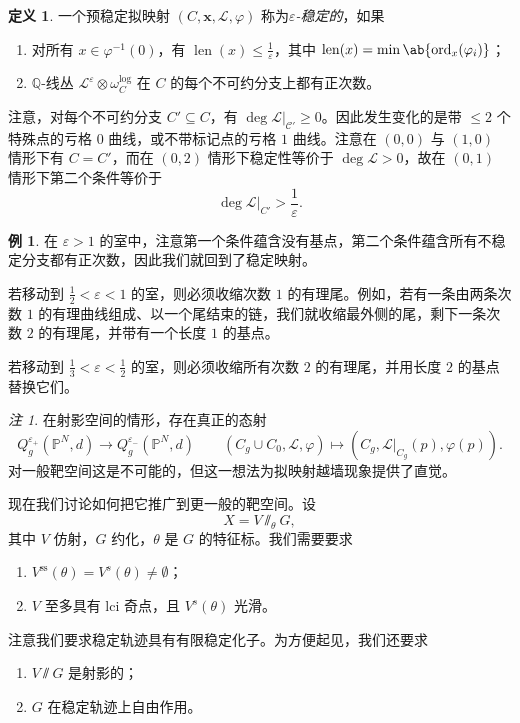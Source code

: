 \documentclass{amsart}
\theoremstyle{definition}
\newtheorem{defn}[thm]{定义}
\newtheorem{exm}[thm]{例}
\theoremstyle{remark}
\newtheorem{rmk}[thm]{注}
\theoremstyle{plain}
\theoremstyle{definition}
\theoremstyle{remark}
\newcommand{\Q}{\mathbb{Q}}
\renewcommand{\P}{\mathbb{P}}
\newcommand{\ep}{\varepsilon}
\newcommand{\mc}[1]{\mathcal{#1}}
\newcommand{\mr}[1]{\mathrm{#1}}
\newcommand{\on}[1]{\operatorname{#1}}
\newcommand{\1}{\mathbf{1}}
\newcommand{\2}{\mathbf{2}}
\newcommand{\3}{\mathbf{3}}
\begin{document}
\begin{defn}
    一个预稳定拟映射 \((C, \mathbf{x}, \mc{L}, \varphi)\) 称为\textit{\(\ep\)-稳定的}，如果
    \begin{enumerate}
        \item 对所有 \(x \in \varphi^{-1}(0)\)，有 \(\on{len}(x) \leq \frac{1}{\ep}\)，其中 \(\on{len}(x) = \min \ab\{ \on{ord}_x (\varphi_i)\}\)；
        \item \(\Q\)-线丛 \(\mc{L}^{\ep} \otimes \omega_C^{\log}\) 在 \(C\) 的每个不可约分支上都有正次数。
    \end{enumerate}
\end{defn}

注意，对每个不可约分支 \(C' \subseteq C\)，有 \(\deg \mc{L}|_{\mc{C}'} \geq 0\)。因此发生变化的是带 \(\leq 2\) 个特殊点的亏格 \(0\) 曲线，或不带标记点的亏格 \(1\) 曲线。注意在 \((0,0)\) 与 \((1,0)\) 情形下有 \(C = C'\)，而在 \((0,2)\) 情形下稳定性等价于 \(\deg \mc{L} > 0\)，故在 \((0,1)\) 情形下第二个条件等价于
\[ \deg \mc{L}|_{C'} > \frac{1}{\ep}. \]

\begin{exm}
    在 \(\ep > 1\) 的室中，注意第一个条件蕴含没有基点，第二个条件蕴含所有不稳定分支都有正次数，因此我们就回到了稳定映射。

    若移动到 \(\frac{1}{2} < \ep < 1\) 的室，则必须收缩次数 \(1\) 的有理尾。例如，若有一条由两条次数 \(1\) 的有理曲线组成、以一个尾结束的链，我们就收缩最外侧的尾，剩下一条次数 \(2\) 的有理尾，并带有一个长度 \(1\) 的基点。

    若移动到 \(\frac{1}{3} < \ep < \frac{1}{2}\) 的室，则必须收缩所有次数 \(2\) 的有理尾，并用长度 \(2\) 的基点替换它们。
\end{exm}

\begin{rmk}
    在射影空间的情形，存在真正的态射
    \[ Q_g^{\ep_+}(\P^N, d) \to Q_g^{\ep_-}(\P^N, d) \qquad (C_g \cup C_0, \mc{L}, \varphi) \mapsto (C_g, \mc{L}|_{C_g}(p), \varphi(p)). \]
    对一般靶空间这是不可能的，但这一想法为拟映射越墙现象提供了直觉。
\end{rmk}

现在我们讨论如何把它推广到更一般的靶空间。设
\[ X = V \sslash_{\theta} G, \]
其中 \(V\) 仿射，\(G\) 约化，\(\theta\) 是 \(G\) 的特征标。我们需要要求
\begin{enumerate}
    \item \(V^{\mr{ss}}(\theta) = V^s(\theta) \neq \emptyset\)；
    \item \(V\) 至多具有 lci 奇点，且 \(V^s(\theta)\) 光滑。
\end{enumerate}
注意我们要求稳定轨迹具有有限稳定化子。为方便起见，我们还要求
\begin{enumerate}
    \item \(V \sslash G\) 是射影的；
    \item \(G\) 在稳定轨迹上自由作用。
\end{enumerate}
\end{document}

